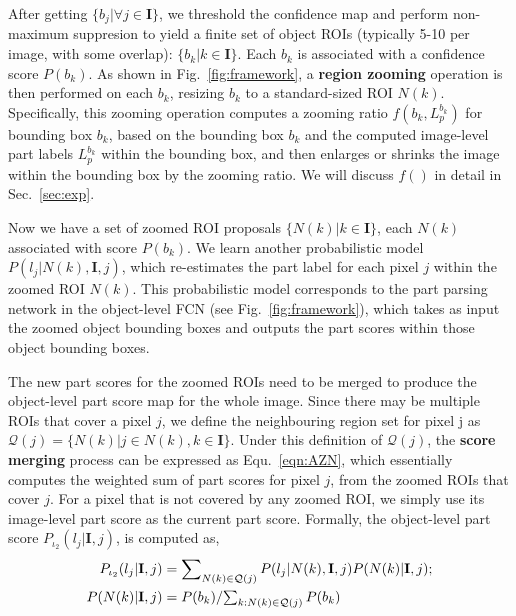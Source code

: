 \documentclass[runningheads]{llncs}
\newcommand{\hua}[1]{{\mathcal #1}}
\newcommand{\ve}[1]{{\mathbf #1}}
\begin{document}
After getting $\{b_j |\forall j\in\ve{I}\}$, we threshold the confidence map and perform non-maximum suppresion to yield a finite set of object ROIs (typically 5-10 per image, with some overlap): $\{b_k | k \in \ve{I}\}$. Each $b_k$ is associated with a confidence score $P(b_k)$. As shown in Fig.~\ref{fig:framework}, a \textbf{region zooming} operation is then performed on each $b_k$, resizing $b_k$ to a standard-sized ROI $N(k)$. Specifically, this zooming operation computes a zooming ratio $f(b_k, L^{b_k}_p)$ for bounding box $b_k$, based on the bounding box $b_k$ and the computed image-level part labels $L^{b_k}_p$ within the bounding box, and then enlarges or shrinks the image within the bounding box by the zooming ratio. We will discuss $f()$ in detail in Sec.~\ref{sec:exp}.

Now we have a set of zoomed ROI proposals $\{N(k)|k\in\ve{I}\}$, each $N(k)$ associated with score $P(b_k)$. We learn another probabilistic model $P(l_j | N(k), \ve{I}, j)$, which re-estimates the part label for each pixel $j$ within the zoomed ROI $N(k)$. This probabilistic model corresponds to the part parsing network in the object-level FCN (see Fig.~\ref{fig:framework}), which takes as input the zoomed object bounding boxes and outputs the part scores within those object bounding boxes.

The new part scores for the zoomed ROIs need to be merged to produce the object-level part score map for the whole image. Since there may be multiple ROIs that cover a pixel $j$, we define the neighbouring region set for pixel j as $\hua{Q}(j)=\{N(k) | j \in N(k), k \in \ve{I}\}$. Under this definition of $\hua{Q}(j)$, the \textbf{score merging} process can be expressed as Equ.~\ref{eqn:AZN}, which essentially computes the weighted sum of part scores for pixel $j$, from the zoomed ROIs that cover $j$. For a pixel that is not covered by any zoomed ROI, we simply use its image-level part score as the current part score. Formally, the object-level part score $P_{\iota_2}(l_j|\ve{I}, j)$, is computed as, 
\begin{align}
\vspace{-1.6\baselineskip}
P_{\iota_2}(l_j|\ve{I}, j) &= \sum\nolimits_{N(k) \in \hua{Q}(j)} P(l_j | N(k), \ve{I}, j) P(N(k) | \ve{I}, j);  \nonumber \\
P(N(k) | \ve{I}, j) &= P(b_k) / \textstyle{\sum_{k: N(k) \in \hua{Q}(j)} P(b_k)}
\label{eqn:AZN}
\end{align}
\end{document}
